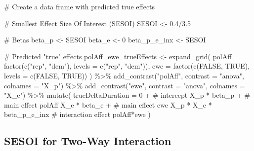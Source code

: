 \documentclass[
  letterpaper,
  DIV=11,
  numbers=noendperiod]{scrartcl}
\newenvironment{Shaded}{\begin{snugshade}}{\end{snugshade}}
\newcommand{\AttributeTok}[1]{\textcolor[rgb]{0.40,0.45,0.13}{#1}}
\newcommand{\CommentTok}[1]{\textcolor[rgb]{0.37,0.37,0.37}{#1}}
\newcommand{\ConstantTok}[1]{\textcolor[rgb]{0.56,0.35,0.01}{#1}}
\newcommand{\DecValTok}[1]{\textcolor[rgb]{0.68,0.00,0.00}{#1}}
\newcommand{\FloatTok}[1]{\textcolor[rgb]{0.68,0.00,0.00}{#1}}
\newcommand{\FunctionTok}[1]{\textcolor[rgb]{0.28,0.35,0.67}{#1}}
\newcommand{\NormalTok}[1]{\textcolor[rgb]{0.00,0.23,0.31}{#1}}
\newcommand{\OtherTok}[1]{\textcolor[rgb]{0.00,0.23,0.31}{#1}}
\newcommand{\SpecialCharTok}[1]{\textcolor[rgb]{0.37,0.37,0.37}{#1}}
\newcommand{\StringTok}[1]{\textcolor[rgb]{0.13,0.47,0.30}{#1}}
\begin{document}
\begin{Shaded}
\begin{Highlighting}[]
\CommentTok{\# Create a data frame with predicted true effects}

\CommentTok{\# Smallest Effect Size Of Interest (SESOI)}
\NormalTok{SESOI }\OtherTok{\textless{}{-}} \FloatTok{0.4}\SpecialCharTok{/}\FloatTok{3.5}

\CommentTok{\# Betas}
\NormalTok{beta\_p }\OtherTok{\textless{}{-}}\NormalTok{ SESOI}
\NormalTok{beta\_e }\OtherTok{\textless{}{-}} \DecValTok{0}
\NormalTok{beta\_p\_e\_inx }\OtherTok{\textless{}{-}}\NormalTok{ SESOI}

\CommentTok{\# Predicted "true" effects}
\NormalTok{polAff\_ewe\_trueEffects }\OtherTok{\textless{}{-}} \FunctionTok{expand\_grid}\NormalTok{(}
  \AttributeTok{polAff =} \FunctionTok{factor}\NormalTok{(}\FunctionTok{c}\NormalTok{(}\StringTok{"rep"}\NormalTok{, }\StringTok{"dem"}\NormalTok{), }\AttributeTok{levels =} \FunctionTok{c}\NormalTok{(}\StringTok{"rep"}\NormalTok{, }\StringTok{"dem"}\NormalTok{)),}
  \AttributeTok{ewe =} \FunctionTok{factor}\NormalTok{(}\FunctionTok{c}\NormalTok{(}\ConstantTok{FALSE}\NormalTok{, }\ConstantTok{TRUE}\NormalTok{), }\AttributeTok{levels =} \FunctionTok{c}\NormalTok{(}\ConstantTok{FALSE}\NormalTok{, }\ConstantTok{TRUE}\NormalTok{))}
\NormalTok{) }\SpecialCharTok{\%\textgreater{}\%} 
  \FunctionTok{add\_contrast}\NormalTok{(}\StringTok{"polAff"}\NormalTok{, }\AttributeTok{contrast =} \StringTok{"anova"}\NormalTok{, }\AttributeTok{colnames =} \StringTok{"X\_p"}\NormalTok{) }\SpecialCharTok{\%\textgreater{}\%} 
  \FunctionTok{add\_contrast}\NormalTok{(}\StringTok{"ewe"}\NormalTok{, }\AttributeTok{contrast =} \StringTok{"anova"}\NormalTok{, }\AttributeTok{colnames =} \StringTok{"X\_e"}\NormalTok{) }\SpecialCharTok{\%\textgreater{}\%} 
  \FunctionTok{mutate}\NormalTok{(}
    \AttributeTok{trueDeltaDuration =}
      \DecValTok{0} \SpecialCharTok{+}                        \CommentTok{\# intercept}
\NormalTok{      X\_p }\SpecialCharTok{*}\NormalTok{ beta\_p }\SpecialCharTok{+}             \CommentTok{\# main effect polAff}
\NormalTok{      X\_e }\SpecialCharTok{*}\NormalTok{ beta\_e }\SpecialCharTok{+}             \CommentTok{\# main effect ewe}
\NormalTok{      X\_p }\SpecialCharTok{*}\NormalTok{ X\_e }\SpecialCharTok{*}\NormalTok{ beta\_p\_e\_inx   }\CommentTok{\# interaction effect polAff*ewe}
\NormalTok{  )}
\end{Highlighting}
\end{Shaded}

\subsection{SESOI for Two-Way Interaction}\label{sec-SESOI_2wayInt}
\end{document}
